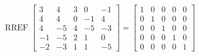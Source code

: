 \begin{exerciseAnswer} 


\[\operatorname{RREF} \left[\begin{array}{ccccc}
3 & 4 & 3 & 0 & -1 \\
4 & 4 & 0 & -1 & 4 \\
4 & -5 & 4 & -5 & -3 \\
-1 & -5 & 2 & 1 & 0 \\
-2 & -3 & 1 & 1 & -5
\end{array}\right] = \left[\begin{array}{ccccc}
1 & 0 & 0 & 0 & 0 \\
0 & 1 & 0 & 0 & 0 \\
0 & 0 & 1 & 0 & 0 \\
0 & 0 & 0 & 1 & 0 \\
0 & 0 & 0 & 0 & 1
\end{array}\right] \]



\end{exerciseAnswer}
